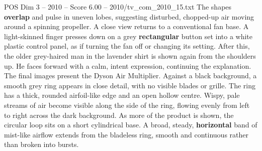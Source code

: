 \begin{textsample}{POS Dim 3 – 2010 – Score 6.00 – 2010/tv\_com\_2010\_15.txt}
The shapes \textbf{overlap} and pulse in uneven lobes, suggesting disturbed, chopped-up air moving around a spinning propeller.
A close view returns to a conventional fan base.
A light-skinned finger presses down on a grey \textbf{rectangular} button set into a white plastic control panel, as if turning the fan off or changing its setting.
After this, the older grey-haired man in the lavender shirt is shown again from the shoulders up.
He faces forward with a calm, intent expression, continuing the explanation.
The final images present the Dyson Air Multiplier.
Against a black background, a smooth grey ring appears in close detail, with no visible blades or grille.
The ring has a thick, rounded airfoil-like edge and an open hollow centre.
Wispy, pale streams of air become visible along the side of the ring, flowing evenly from left to right across the dark background.
As more of the product is shown, the circular loop sits on a short cylindrical base.
A broad, steady, \textbf{horizontal} band of mist-like airflow extends from the bladeless ring, smooth and continuous rather than broken into bursts.

\end{textsample}
